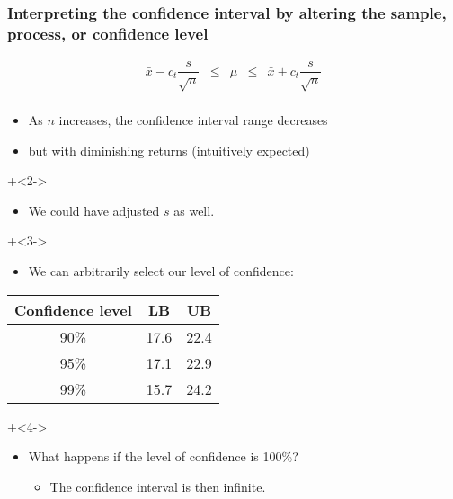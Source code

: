 \begin{frame}\frametitle{Interpreting the confidence interval by altering the sample, process, or confidence level}

	\[
		\begin{array}{rcccl}
			\bar{x} - c_t \dfrac{s}{\sqrt{n}} &\leq& \mu &\leq& \bar{x} + c_t\dfrac{s}{\sqrt{n}} \\
		\end{array}
	\]
	\begin{itemize}
		\item	As $n$ increases, the confidence interval range decreases
		\item	but with diminishing returns (intuitively expected)
	\end{itemize}
	
	\vspace{10pt}
	\onslide+<2->{
		\begin{itemize}
			\item	We could have adjusted $s$ as well.
		\end{itemize}
	}
	\onslide+<3->{
		\begin{itemize}
			\item	We can arbitrarily select our level of confidence:
		\end{itemize}
		\begin{center}
			\begin{tabular}{c|cc}
				\textbf{Confidence level} & \textbf{LB} & \textbf{UB}\\ \hline
				90\%	& 17.6	&	22.4\\
				95\%	& 17.1	&	22.9\\
				99\%	& 15.7	&	24.2\\
			\end{tabular}
		\end{center}
	}
	\onslide+<4->{
		\begin{itemize}
			\item	What happens if the level of confidence is 100\%?
			\begin{itemize}
				\item	The confidence interval is then infinite.
			\end{itemize}
		\end{itemize}
	}
\end{frame}

